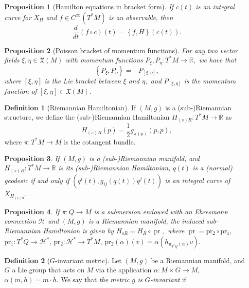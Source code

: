 \documentclass [xcolor=svgnames, t] {beamer}
\theoremstyle{definition}
\newtheorem{df}{Definition}
\theoremstyle{plain}
\newtheorem{prop}{Proposition}
\theoremstyle{remark}
\begin{document}
\begin{frame}
\begin{prop}[Hamilton equations in bracket form]\label{prop:HEBF}
	If $ c(t) $ is an integral curve for $ X_H $ and $ f\in C^\infty(T^*M) $ is an observable, then
	\begin{equation}\label{eq:HamEq}
		\frac{d}{dt} \left( f\circ c \right)(t) = \left\{ f,H \right\} (c(t)).
	\end{equation}
\end{prop}
\begin{prop}[Poisson bracket of momentum functions]\label{prop:poisson_bracket_momentum}
	For any two vector fields $ \xi,\eta \in \mathfrak{X}(M) $ with momentum functions $ P_\xi, P_\eta: T^*M \rightarrow \mathbb{R}, $ we have that
	$$ \left\{ P_\xi,P_\eta \right\} = -P_{[\xi,\eta]}, $$ 
	where $ [\xi,\eta] $ is the Lie bracket between $ \xi $ and $ \eta, $ and $ P_{[\xi,\eta]} $ is the momentum function of $ [\xi,\eta]\in \mathfrak{X}(M). $  
\end{prop}
\begin{df}[Riemannian Hamiltonian]
	If $ (M,g) $ is a (sub-)Riemannian structure, we define the (sub-)Riemannian Hamiltonian $ H_{(s)R}: T^*M \rightarrow \mathbb{R} $ as	
	$$ H_{(s)R}(p) = \frac{1}{2} g_{\pi(p)}(p,p), $$ where $ \pi: T^*M \rightarrow M $ is the cotangent bundle.
\end{df}
\begin{prop}\label{prop:geo}
	If $ (M,g) $ is a (sub-)Riemannian manifold, and $ H_{(s)R}: T^*M \rightarrow \mathbb{R} $ is its (sub-)Riemannian Hamiltonian, $ q(t) $ is a (normal) geodesic if and only if $ (q^i(t), g_{ij}(q(t))\dot{q^j}(t)) $ is an integral curve of $ X_{H_{(s)R}}. $ 
\end{prop}
\begin{prop}
	If $ \pi: Q \rightarrow M $ is a submersion endowed with an Ehresmann connection $ \mathcal{H} $  and $ (M,g) $ is a Riemannian manifold, the induced sub-Riemannian Hamiltonian is given by $H_{sR}= H_R \circ \operatorname{pr},$ where $ \operatorname{pr}= \operatorname{pr_2}\circ \operatorname{pr_1}, $ $ \operatorname{pr_1} : T^*Q \rightarrow \mathcal{H}^*  $, $ \operatorname{pr_2} : \mathcal{H}^* \rightarrow T^*M, \ \operatorname{pr_2}(\alpha)(v)= \alpha(h_{\pi_{T^*Q}(\alpha)}v).  $  
\end{prop}
\begin{df}[$G$-invariant metric]
	Let $ (M,g) $ be a Riemannian manifold, and $G $ a Lie group that acts on $ M $ via the application $ \alpha: M\times G \rightarrow M, $ $ \alpha(m,h)= m\cdot h. $ We say that \textit{the metric $ g $ is $ G $-invariant} if  

\end{df}
\end{frame}
\end{document}
